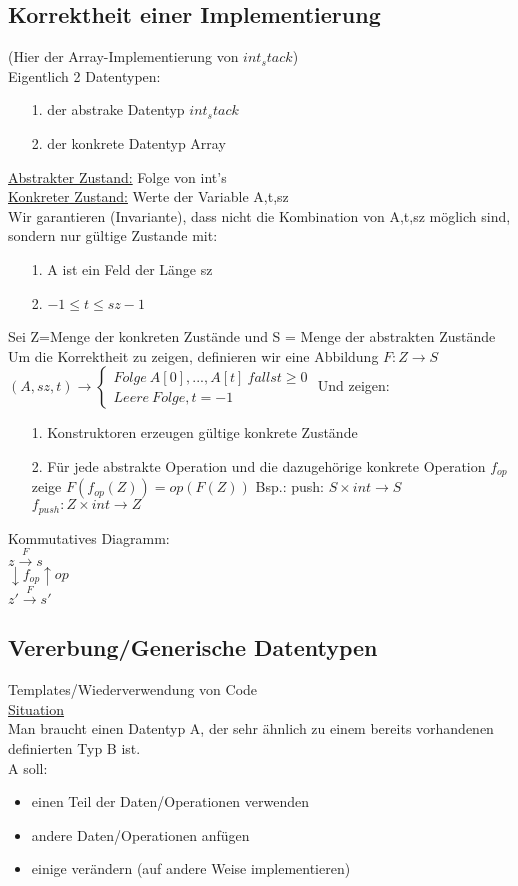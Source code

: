 \documentclass[a4paper]{article}
\begin{document}
\subsection*{Korrektheit einer Implementierung}
(Hier der Array-Implementierung von $int_stack$)\\
Eigentlich 2 Datentypen:
\begin{itemize}
\item[1.] der abstrake Datentyp $int_stack$
\item[2.] der konkrete Datentyp Array
\end{itemize}
\underline{Abstrakter Zustand:} Folge von int's\\
\underline{Konkreter Zustand:} Werte der Variable A,t,sz\\
Wir garantieren (Invariante), dass nicht die Kombination von A,t,sz möglich sind, sondern nur gültige Zustande mit:
\begin{itemize}
\item[1.]A ist ein Feld der Länge sz
\item[2.] $-1 \leq t\leq sz-1$
\end{itemize}
Sei Z=Menge der konkreten Zustände und S = Menge der abstrakten Zustände\\
Um die Korrektheit zu zeigen, definieren wir eine Abbildung $F: Z \rightarrow S$\\
$(A,sz,t) \rightarrow \left\lbrace \begin{array}{l}
	Folge\ A[0],...,A[t]\ falls t\geq 0\\
	Leere\ Folge, t=-1
\end{array}\right.$
Und zeigen:
\begin{itemize}
\item[1.] Konstruktoren erzeugen gültige konkrete Zustände
\item[2.] Für jede abstrakte Operation und die dazugehörige konkrete Operation $f_{op}$ zeige $F(f_{op}(Z)) = op(F(Z))$
	Bsp.: push: $S\times int \rightarrow S $\\
	$f_{push}: Z \times int \rightarrow Z$
\end{itemize}
Kommutatives Diagramm:\\
$z \xrightarrow{F} s$\\
$\downarrow f_{op} \uparrow op$\\
$z' \xrightarrow{F} s'$
\subsection*{Vererbung/Generische Datentypen}
Templates/Wiederverwendung von Code\\
\underline{Situation}\\
Man braucht einen Datentyp A, der sehr ähnlich zu einem bereits vorhandenen definierten Typ B ist.\\
A soll:\\
\begin{itemize}
\item einen Teil der Daten/Operationen verwenden
\item andere Daten/Operationen anfügen
\item einige verändern (auf andere Weise implementieren)
\end{itemize}
\end{document}

